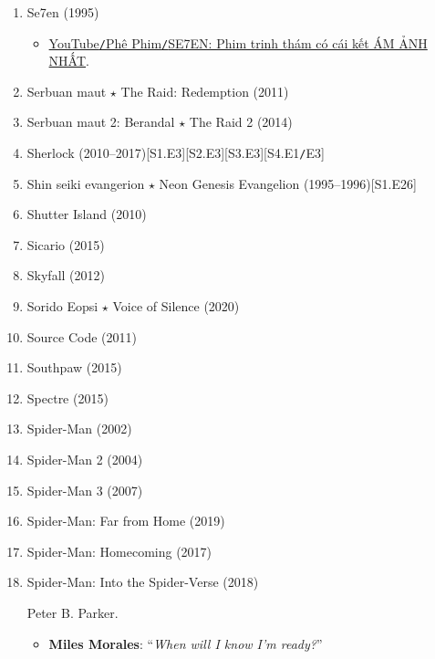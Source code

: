 \documentclass{article}
\begin{document}
\begin{enumerate}
	\item {\sc Se7en} (1995)
	\begin{itemize}
		\item \href{https://www.youtube.com/watch?v=mL9aHJDGDrM}{YouTube{\tt/}Phê Phim{\tt/}SE7EN: Phim trinh thám có cái kết ÁM ẢNH NHẤT}.
	\end{itemize}
	\item {\sc Serbuan maut $\star$ The Raid: Redemption} (2011)
	\item {\sc Serbuan maut 2: Berandal $\star$ The Raid 2} (2014)
	\item {\sc Sherlock} (2010--2017)\hfill[S1.E3][S2.E3][S3.E3][S4.E1{\tt/}E3]
	\item Shin seiki evangerion $\star$ Neon Genesis Evangelion (1995--1996)\hfill[S1.E26]
	\item {\sc Shutter Island} (2010)
	\item {\sc Sicario} (2015)
	\item {\sc Skyfall} (2012)
	\item {\sc Sorido Eopsi $\star$ Voice of Silence} (2020)
	\item {\sc Source Code} (2011)
	\item {\sc Southpaw} (2015)
	\item {\sc Spectre} (2015)
	\item {\sc Spider-Man} (2002)
	\item {\sc Spider-Man 2} (2004)
	\item {\sc Spider-Man 3} (2007)
	\item {\sc Spider-Man: Far from Home} (2019)
	\item {\sc Spider-Man: Homecoming} (2017)
	\item {\sc Spider-Man: Into the Spider-Verse} (2018)

	{\sf Peter B. Parker.}
	\begin{itemize}
		\item {\bf Miles Morales}: ``{\it When will I know I'm ready?}''


\end{itemize}
\end{enumerate}
\end{document}
